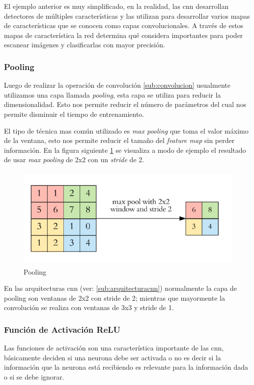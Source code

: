 El ejemplo anterior es muy simplificado, en la realidad, las \ac{cnn} desarrollan detectores de múltiples características y las utilizan para desarrollar varios mapas de características que se conocen como capas convolucionales. A través de estos mapas de característica la red determina qué  considera importantes para poder escanear imágenes y clasificarlas con mayor precisión.
\subsubsection{Pooling}\label{sub:pooling}

Luego de realizar la operación de convolución \ref{sub:convolucion} usualmente utilizamos una capa llamada \textit{pooling}, esta capa se utiliza para reducir la dimensionalidad. Esto nos permite reducir el número de parámetros del cual nos permite disminuir el tiempo de entrenamiento.

El tipo de técnica mas común utilizado es \textit{max pooling} que toma el valor máximo de la ventana, esto nos permite reducir el tamaño del \textit{feature map} sin perder información. En la figura siguiente \ref{Fig:Pooling} se visualiza a modo de ejemplo el resultado de usar \textit{max pooling} de 2x2 con un \textit{stride} de 2.

\begin{figure}[H]
 \centering
  \includegraphics[height=5cm,keepaspectratio=true,clip=true]{imagenes/MarcoTeorico/pooling_1.png}
  \caption{Pooling} \label{Fig:Pooling}
\end{figure}

En las arquitecturas \ac{cnn} (ver: \ref{sub:arquitecturacnn}) normalmente la capa de pooling son ventanas de 2x2 con stride de 2; mientras que mayormente la convolución se realiza con ventanas de 3x3 y stride de 1. 

\subsubsection{Función de Activación  ReLU}\label{sub:relu}
Las funciones de activación son una característica  importante de las \ac{cnn}, básicamente deciden si una neurona debe ser activada o no es decir si la información que la neurona está recibiendo es relevante para la información dada o si se debe ignorar.

